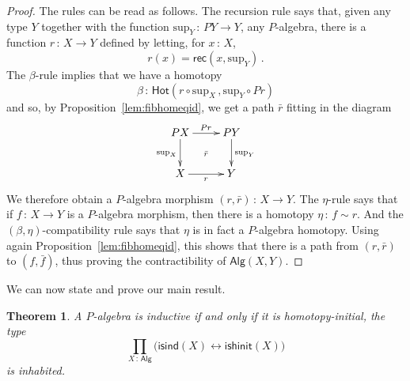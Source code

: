 \documentclass[10pt,a4paper,oneside,reqno]{amsart}
\theoremstyle{mythm}
\newtheorem{theorem}{Theorem}[section]
\theoremstyle{mydef}
\theoremstyle{myrmk}
\newcommand{\ie}{\text{i.e.\ }}
\newcommand{\co}{\,{:}\,}
\newcommand{\isalgind}{\mathsf{isind}}
\newcommand{\isalghinit}{\mathsf{ishinit}}
\newcommand{\Hot}{\mathsf{Hot}}
\newcommand{\rec}{\mathsf{rec}}
\newcommand{\Palg}{\mathsf{Alg}}
\renewcommand{\sup}{\mathrm{sup}}
\begin{document}
\begin{proof} The rules can be read as follows. The recursion rule says that, given any type $Y$ together 
with the function $\sup_Y \co PY \to Y$, \ie any $P$-algebra, there is a function $r \co X \to Y$
defined by letting,  for $x \co X$, 
\[
r(x) = \rec(x, \sup_Y) \, .
\]
The $\beta$-rule implies that we have a homotopy 
\[
\beta \co \Hot( r \circ \sup_X \, , \sup_Y \circ Pr)
\]
and so, by Proposition~\ref{lem:fibhomeqid}, we get a path $\bar{r}$ fitting in the diagram
\[
\xymatrix{
PX \ar[d]_{\sup_X} \ar[r]^{Pr} \ar@{}[dr]|{\bar{r}} & PY \ar[d]^{\sup_Y} \\
X \ar[r]_r & Y}
\]
We therefore obtain a $P$-algebra morphism  $(r, \bar{r}) \co X \to Y$.  The 
$\eta$-rule says that if $f \co X \to Y$ is a $P$-algebra morphism, then there is a homotopy $\eta \co f \sim r$.  
And the $(\beta,\eta)$-compatibility rule says that $\eta$ is in fact a $P$-algebra homotopy. Using again 
Proposition~\ref{lem:fibhomeqid}, this shows that there is a path from $(r, \bar{r})$ to $(f, \bar{f})$, thus
proving the contractibility of $\Palg(X,Y)$.
\end{proof}



We can now state and prove our main result. 

\begin{theorem}\label{thm:WMain} A $P$-algebra is inductive if and only if
it is homotopy-initial, \ie the type
\[ 
\prod_{X \co \Palg} \big( \isalgind(X) \leftrightarrow \isalghinit(X) \big)
\]
is inhabited. 
\end{theorem}
\end{document}
